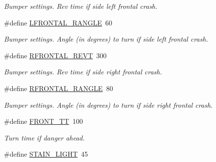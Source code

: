 \begin{DoxyCompactItemize}
\begin{DoxyCompactList}\small\item\em Bumper settings. Rev time if side left frontal crash. \item\end{DoxyCompactList}\item 
\hypertarget{reactor_8nxc_ad19631fb45582ad9441719c376c07c3b}{
\#define \hyperlink{reactor_8nxc_ad19631fb45582ad9441719c376c07c3b}{LFRONTAL\_\-RANGLE}~60}
\label{reactor_8nxc_ad19631fb45582ad9441719c376c07c3b}

\begin{DoxyCompactList}\small\item\em Bumper settings. Angle (in degrees) to turn if side left frontal crash. \item\end{DoxyCompactList}\item 
\hypertarget{reactor_8nxc_a623033e48068d57555d513a2d56d0c40}{
\#define \hyperlink{reactor_8nxc_a623033e48068d57555d513a2d56d0c40}{RFRONTAL\_\-REVT}~300}
\label{reactor_8nxc_a623033e48068d57555d513a2d56d0c40}

\begin{DoxyCompactList}\small\item\em Bumper settings. Rev time if side right frontal crash. \item\end{DoxyCompactList}\item 
\hypertarget{reactor_8nxc_a70438bca69ec65d9a29a9f120922464d}{
\#define \hyperlink{reactor_8nxc_a70438bca69ec65d9a29a9f120922464d}{RFRONTAL\_\-RANGLE}~80}
\label{reactor_8nxc_a70438bca69ec65d9a29a9f120922464d}

\begin{DoxyCompactList}\small\item\em Bumper settings. Angle (in degrees) to turn if side right frontal crash. \item\end{DoxyCompactList}\item 
\hypertarget{reactor_8nxc_a7861c2174f24a87c43840f87f3cf8a14}{
\#define \hyperlink{reactor_8nxc_a7861c2174f24a87c43840f87f3cf8a14}{FRONT\_\-TT}~100}
\label{reactor_8nxc_a7861c2174f24a87c43840f87f3cf8a14}

\begin{DoxyCompactList}\small\item\em Turn time if danger ahead. \item\end{DoxyCompactList}\item 
\hypertarget{reactor_8nxc_abac7e3cf78ac568c0622e8497156baf1}{
\#define \hyperlink{reactor_8nxc_abac7e3cf78ac568c0622e8497156baf1}{STAIN\_\-LIGHT}~45}
\label{reactor_8nxc_abac7e3cf78ac568c0622e8497156baf1}


\end{DoxyCompactItemize}
